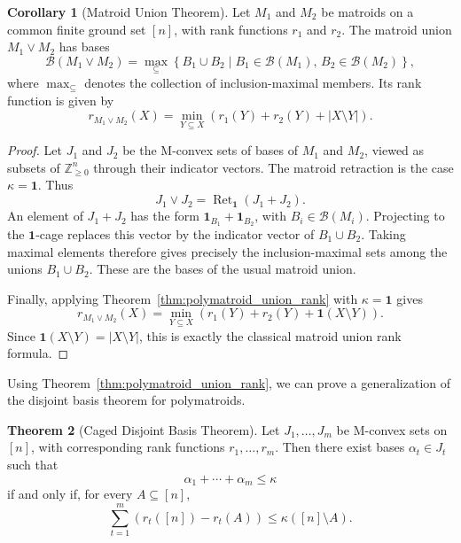\documentclass[11pt]{article}
\theoremstyle{definition}
\newtheorem{theorem}{Theorem}[section]
\newtheorem{corollary}[theorem]{Corollary}
\theoremstyle{remark}
\newcommand{\ones}{\textbf{1}}
\DeclareMathOperator{\Ret}{Ret}                %
\begin{document}
\begin{corollary}[Matroid Union Theorem]\label{corr:matroid_union}
    Let $M_1$ and $M_2$ be matroids on a common finite ground set $[n]$,
    with rank functions $r_1$ and $r_2$. The matroid union $M_1\vee M_2$
    has bases
    \[
        \mathcal{B}(M_1\vee M_2)
        =
        \max_{\subseteq}
        \left\{
            B_1\cup B_2
            \mid
            B_1\in\mathcal{B}(M_1),\,
            B_2\in\mathcal{B}(M_2)
        \right\},
    \]
    where $\max_{\subseteq}$ denotes the collection of inclusion-maximal
    members. Its rank function is given by
    \[
        r_{M_1\vee M_2}(X)
        =
        \min_{Y\subseteq X}
        \left(
            r_1(Y)+r_2(Y)+|X\setminus Y|
        \right).
    \]
\end{corollary}

\begin{proof}
    Let $J_1$ and $J_2$ be the M-convex sets of bases of $M_1$ and $M_2$,
    viewed as subsets of $\mathbb{Z}_{\geq0}^n$ through their indicator
    vectors. The matroid retraction is the case $\kappa=\ones$. Thus
    \[
        J_1\vee J_2
        =
        \Ret_{\ones}(J_1+J_2).
    \]
    An element of $J_1+J_2$ has the form
    $\ones_{B_1}+\ones_{B_2}$, with
    $B_i\in\mathcal{B}(M_i)$. Projecting to the $\ones$-cage replaces
    this vector by the indicator vector of $B_1\cup B_2$. Taking maximal
    elements therefore gives precisely the inclusion-maximal sets among
    the unions $B_1\cup B_2$. These are the bases of the usual matroid
    union.

    Finally, applying Theorem~\ref{thm:polymatroid_union_rank} with
    $\kappa=\ones$ gives
    \[
        r_{M_1\vee M_2}(X)
        =
        \min_{Y\subseteq X}
        \left(
            r_1(Y)+r_2(Y)+\ones(X\setminus Y)
        \right).
    \]
    Since $\ones(X\setminus Y)=|X\setminus Y|$, this is exactly the
    classical matroid union rank formula.
\end{proof}
Using Theorem~\ref{thm:polymatroid_union_rank}, we can prove a generalization of the disjoint basis theorem for polymatroids.
\begin{theorem}[Caged Disjoint Basis Theorem]
\label{thm:caged_disjoint_basis}
    Let $J_1,\dots,J_m$ be M-convex sets on $[n]$, with corresponding rank
    functions $r_1,\dots,r_m$. Then there exist bases
    $\alpha_t\in J_t$ such that
    \[
        \alpha_1+\cdots+\alpha_m\leq\kappa
    \]
    if and only if, for every $A\subseteq[n]$,
    \[
        \sum_{t=1}^m
        \left(
            r_t([n])-r_t(A)
        \right)
        \leq
        \kappa([n]\setminus A).
    \]
\end{theorem}
\end{document}
